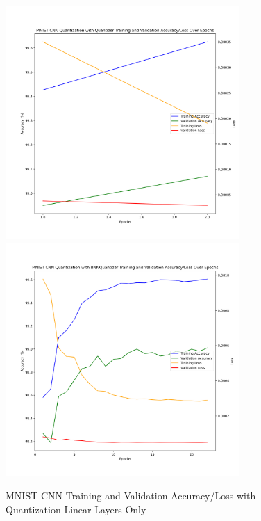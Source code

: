 \documentclass{article}
\begin{document}
\begin{figure}
	\centerline{\includegraphics[width=3.5in]{../proj2/figures/mnist_cnn_QAT_Quantizer_linear.png}\includegraphics[width=3.5in]{../proj2/figures/mnist_cnn_BNNQuantizer_linear.png}}
	\caption{MNIST CNN Training and Validation Accuracy/Loss with Quantization Linear Layers Only}
	\label{fig:mnist-charts-old}
\end{figure}
\end{document}
